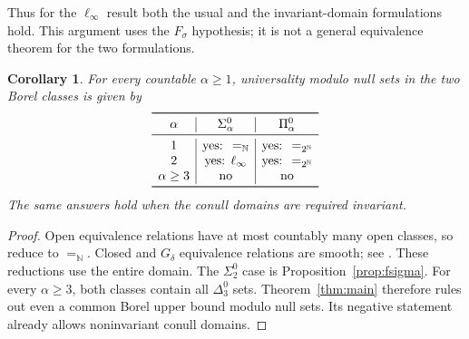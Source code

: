 \documentclass[11pt]{article}
\newtheorem{corollary}[theorem]{Corollary}
\theoremstyle{definition}
\theoremstyle{remark}
\newcommand{\N}{\mathbb N}
\begin{document}
Thus for the $\ell_\infty$ result both the usual and the invariant-domain
formulations hold. This argument uses the $F_\sigma$ hypothesis; it is
not a general equivalence theorem for the two formulations.

\begin{corollary}\label{cor:hierarchy}
For every countable $\alpha\geq1$, universality modulo null sets in the
two Borel classes is given by
\[
\begin{array}{c|c|c}
\toprule
\alpha & \Sigma^0_\alpha & \Pi^0_\alpha\\
\midrule
1 & \text{yes: }=_{\N} & \text{yes: }=_{2^{\N}}\\
2 & \text{yes: }\ell_\infty & \text{yes: }=_{2^{\N}}\\
\alpha\geq3 & \text{no} & \text{no}\\
\bottomrule
\end{array}
\]
The same answers hold when the conull domains are required invariant.
\end{corollary}
\begin{proof}
Open equivalence relations have at most countably many open classes,
so reduce to $=_{\N}$. Closed and $G_\delta$ equivalence relations are
smooth; see \cite{Gao}. These reductions use the entire domain.
The $\Sigma^0_2$ case is Proposition~\ref{prop:fsigma}.
For every $\alpha\geq3$, both classes contain all $\Delta^0_3$ sets.
Theorem~\ref{thm:main} therefore rules out even a common Borel upper
bound modulo null sets. Its negative statement already allows
noninvariant conull domains.
\end{proof}
\end{document}
